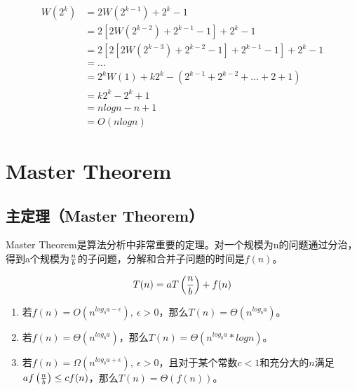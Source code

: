 \begin{align*}
	W(2^k) & = 2W(2^{k-1}) + 2^k - 1                                   \\
	       & = 2[2W(2^{k-2}) + 2^{k-1} - 1] + 2^k - 1                  \\
	       & = 2[2[2W(2^{k-3}) + 2^{k-2} - 1] + 2^{k-1} - 1] + 2^k - 1 \\
	       & = \dots                                                   \\
	       & = 2^k W(1) + k2^k - (2^{k-1} + 2^{k-2} + \dots + 2 + 1)   \\
	       & = k2^k - 2^k + 1                                          \\
	       & = nlogn - n + 1                                           \\
	       & = O(nlogn)
\end{align*}

\newpage

\section{Master Theorem}

\subsection{主定理（Master Theorem）}

Master Theorem是算法分析中非常重要的定理。对一个规模为n的问题通过分治，得到a个规模为$ n \over b $的子问题，分解和合并子问题的时间是$ f(n) $。

\vspace{-0.5cm}

$$
	T(n) = aT\left( {n \over b} \right) + f(n)
$$

\begin{enumerate}
	\item 若$ f(n) = O \left( n^{log_b{a-\epsilon}} \right),\ \epsilon > 0 $，那么$ T(n) = \Theta \left( n^{log_b{a}} \right) $。

	\item 若$ f(n) = \Theta \left( n^{log_b{a}} \right) $，那么$ T(n) = \Theta \left( n^{log_b{a}} * logn \right) $。

	\item 若$ f(n) = \Omega \left( n^{log_b{a+\epsilon}} \right),\ \epsilon > 0 $，且对于某个常数$ c < 1 $和充分大的$ n $满足$ af\left( {n \over b} \right) \le cf(n) $，那么$ T(n) = \Theta(f(n)) $。
\end{enumerate}

